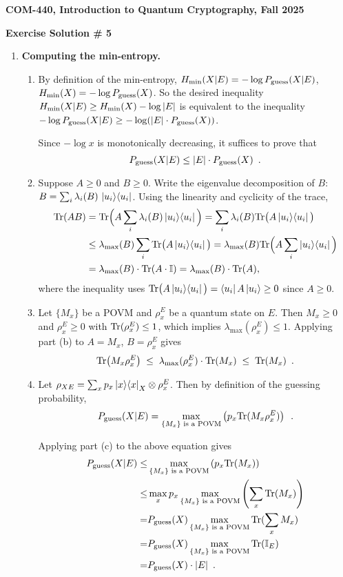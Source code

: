 \documentclass[12pt]{article}
\newcommand{\pguess}{P_{\rm guess}}
\newcommand{\header}[1]{\begin{center} {\large\bf #1} \end{center}}
\begin{document}
\header{COM-440, Introduction to Quantum Cryptography, Fall 2025}
\header{\bf Exercise Solution \# 5}


\begin{enumerate}

\item \textbf{Computing the min-entropy. }
\begin{enumerate}
\item By definition of the min-entropy, $\hmin(X \vert E) =  -\log \pguess(X \vert E)$, $\hmin(X) = -\log \pguess(X)$. So the desired inequality $H_{\rm min}(X|E) \geq H_{\rm min}(X) - \log |E|$ is equivalent to the inequality $-\log \pguess(X \vert E) \ge -\log (|E|\cdot\pguess(X))$.

Since $-\log x$ is monotonically decreasing, it suffices to prove that \[\pguess(X \vert E) \leq |E|\cdot\pguess(X)\enspace.\]
\item Suppose $A \ge 0$ and $B \ge 0$. Write the eigenvalue decomposition of $B$:
$B=\sum_i \lambda_i(B)\, \ket{u_i}\!\bra{u_i}$. Using the linearity
and cyclicity of the trace,
\[
\begin{aligned}
\mathrm{Tr}(AB)
&= \mathrm{Tr} \Big(A \sum_i \lambda_i(B)\ket{u_i}\!\bra{u_i}\Big)
 = \sum_i \lambda_i(B) \mathrm{Tr}\big(A \ket{u_i}\!\bra{u_i}\big) \\
&\le \lambda_{\max}(B) \sum_i \mathrm{Tr}\big(A \ket{u_i}\!\bra{u_i}\big)
 = \lambda_{\max}(B) \mathrm{Tr} \Big(A \sum_i \ket{u_i}\!\bra{u_i}\Big) \\
&= \lambda_{\max}(B) \cdot \mathrm{Tr}(A\cdot \mathbb{I}) = \lambda_{\max}(B) \cdot \mathrm{Tr}(A),
\end{aligned}
\]
where the inequality uses $\mathrm{Tr}\big(A \ket{u_i}\!\bra{u_i}\big)=
\bra{u_i}A\ket{u_i}\ge 0$ since $A\ge 0$.
\item Let $\{M_x\}$ be a POVM and $\rho^{E}_x$ be a quantum state on $E$.
Then $M_x \ge 0$ and $\rho^{E}_x \ge 0$ with $\mathrm{Tr}(\rho^{E}_x)\le 1$, which implies $\lambda_{\max}(\rho^{E}_x)\le 1$.
Applying part (b) to $A=M_x$, $B=\rho^{E}_x$ gives
\[
\mathrm{Tr} \big(M_x \rho^{E}_x\big) \;\le\; \lambda_{\max}(\rho^{E}_x) \cdot \mathrm{Tr}(M_x) \;\le\; \mathrm{Tr}(M_x)\enspace.
\]
\item Let $\rho_{XE} = \sum_x p_x \ket{x}\!\bra{x}_X \otimes \rho_x^E$. Then by definition of the guessing probability,
\[\pguess(X \vert E) = \max_{\{M_x\} \text{ is a POVM}} \left(p_x \Tr(M_x \rho_x^E)\right)\enspace.\]

Applying part (c) to the above equation gives
\begin{align*}
	\pguess(X \vert E) \le&  \max_{\{M_x\} \text{ is a POVM}} \left(p_x \Tr(M_x)\right)\\
	\le& \max_x p_x \max_{\{M_x\} \text{ is a POVM}}\left(\sum_{x}\Tr(M_x)\right)\\
	=& \pguess(X) \max_{\{M_x\} \text{ is a POVM}}\Tr(\sum_x M_x)\\
	=& \pguess(X) \max_{\{M_x\} \text{ is a POVM}}\Tr(\Id_{E})\\
	=& \pguess(X) \cdot |E|\enspace.
\end{align*}


\end{enumerate}
\end{enumerate}
\end{document}
